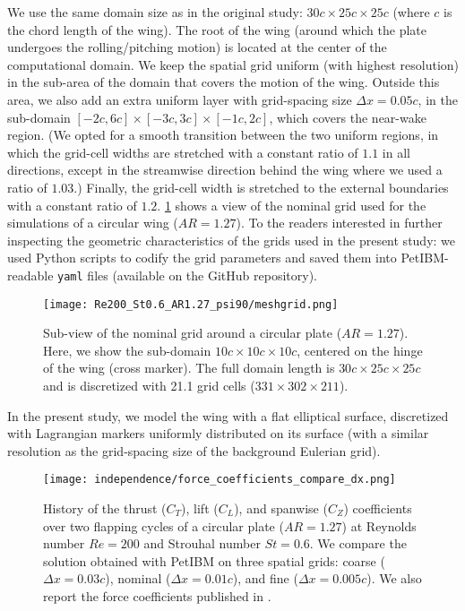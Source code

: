 We use the same domain size as in the original study: $30c \times 25c \times 25c$ (where $c$ is the chord length of the wing).
The root of the wing (around which the plate undergoes the rolling/pitching motion) is located at the center of the computational domain.
We keep the spatial grid uniform (with highest resolution) in the sub-area of the domain that covers the motion of the wing.
Outside this area, we also add an extra uniform layer with grid-spacing size $\Delta x = 0.05c$, in the sub-domain $\left[ -2c, 6c \right] \times \left[ -3c, 3c \right] \times \left[ -1c, 2c \right]$, which covers the near-wake region.
(We opted for a smooth transition between the two uniform regions, in which the grid-cell widths are stretched with a constant ratio of $1.1$ in all directions, except in the streamwise direction behind the wing where we used a ratio of $1.03$.)
Finally, the grid-cell width is stretched to the external boundaries with a constant ratio of $1.2$.
\cref{fig:nominal_grid} shows a view of the nominal grid used for the simulations of a circular wing ($AR = 1.27$).
To the readers interested in further inspecting the geometric characteristics of the grids used in the present study: we used Python scripts to codify the grid parameters and saved them into PetIBM-readable \texttt{yaml} files (available on the GitHub repository).

\begin{figure}[!h]
  \centering
  \texttt{[image: Re200\_St0.6\_AR1.27\_psi90/meshgrid.png]}
  \caption{Sub-view of the nominal grid around a circular plate ($AR = 1.27$). Here, we show the sub-domain $10c \times 10c \times 10c$, centered on the hinge of the wing (cross marker). The full domain length is $30c \times 25c \times 25c$ and is discretized with 21.1 grid cells ($331 \times 302 \times 211$).}
  \label{fig:nominal_grid}
\end{figure}

In the present study, we model the wing with a flat elliptical surface, discretized with Lagrangian markers uniformly distributed on its surface (with a similar resolution as the grid-spacing size of the background Eulerian grid).

\begin{figure}[!h]
  \centering
  \texttt{[image: independence/force\_coefficients\_compare\_dx.png]}
  \caption{History of the thrust ($C_T$), lift ($C_L$), and spanwise ($C_Z$) coefficients over two flapping cycles of a circular plate ($AR = 1.27$) at Reynolds number $Re = 200$ and Strouhal number $St = 0.6$. We compare the solution obtained with PetIBM on three spatial grids: coarse ($\Delta x = 0.03c$), nominal ($\Delta x = 0.01c$), and fine ($\Delta x = 0.005c$). We also report the force coefficients published in \citet{li_dong_2016}.}
  \label{fig:independence_force_coefficients_dx}
\end{figure}

